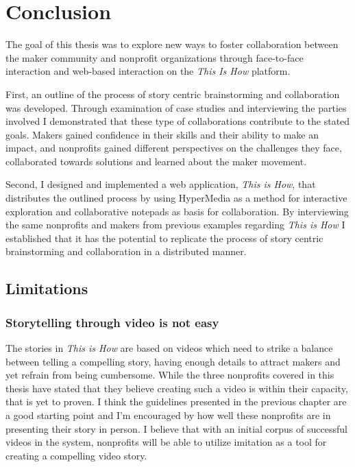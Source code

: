 \chapter{Conclusion}
\label{chap_conclusion}

The goal of this thesis was to explore new ways to foster collaboration between the maker community and nonprofit organizations through face-to-face interaction and web-based interaction on the \textit{This Is How} platform. 

First, an outline of the process of story­ centric brainstorming and collaboration was developed. Through examination of case studies and interviewing the parties involved I demonstrated that these type of collaborations contribute to the stated goals. Makers gained confidence in their skills and their ability to make an impact, and nonprofits gained different perspectives on the challenges they face, collaborated towards solutions and learned about the maker movement. 

Second, I designed and implemented a web application, \textit{This is How}, that distributes the outlined process by using HyperMedia as a method for interactive exploration and collaborative notepads as basis for collaboration. By interviewing the same nonprofits and makers from previous examples regarding \textit{This is How} I established that it has the potential to replicate the process of story­ centric brainstorming and collaboration in a distributed manner.     

\section{Limitations}

\subsection{Storytelling through video is not easy}

The stories in \textit{This is How} are based on videos which need to strike a balance between telling a compelling story, having enough details to attract makers and yet refrain from being cumbersome. While the three nonprofits covered in this thesis have stated that they believe creating such a video is within their capacity, that is yet to proven. I think the guidelines presented in the previous chapter are a good starting point and I'm encouraged by how well these nonprofits are in presenting their story in person. I believe that with an initial corpus of successful videos in the system, nonprofits will be able to utilize imitation as a tool for creating a compelling video story.

